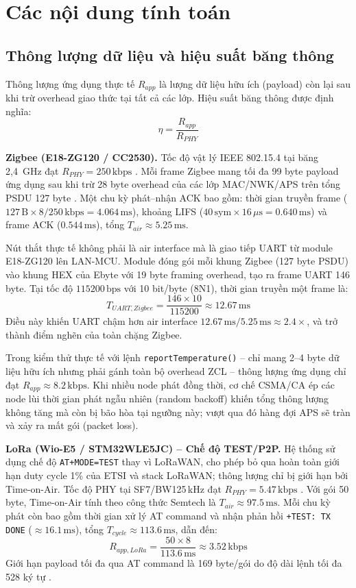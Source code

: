 \chapter{Các nội dung tính toán}
    \section{Thông lượng dữ liệu và hiệu suất băng thông}
 
        Thông lượng ứng dụng thực tế $R_{app}$ là lượng dữ liệu hữu ích (payload) còn lại sau khi trừ overhead giao thức tại tất cả các lớp. Hiệu suất băng thông được định nghĩa:
        \[ \eta = \frac{R_{app}}{R_{PHY}} \]
        
        \textbf{Zigbee (E18-ZG120 / CC2530).} Tốc độ vật lý IEEE 802.15.4 tại băng 2,4~GHz đạt $R_{PHY} = 250\,\text{kbps}$ \cite{ieee802154_2020}. Mỗi frame Zigbee mang tối đa 99 byte payload ứng dụng sau khi trừ 28 byte overhead của các lớp MAC/NWK/APS trên tổng PSDU 127 byte \cite{zigbee_spec_r21}. Một chu kỳ phát--nhận ACK bao gồm: thời gian truyền frame ($127\,\text{B} \times 8 / 250\,\text{kbps} = 4{.}064\,\text{ms}$), khoảng LIFS ($40\,\text{sym} \times 16\,\mu\text{s} = 0{.}640\,\text{ms}$) và frame ACK ($0{.}544\,\text{ms}$), tổng $T_{air} \approx 5{.}25\,\text{ms}$.
        
        Nút thắt thực tế không phải là air interface mà là giao tiếp UART từ module E18-ZG120 lên LAN-MCU. Module đóng gói mỗi khung Zigbee (127 byte PSDU) vào khung HEX của Ebyte với 19 byte framing overhead, tạo ra frame UART 146 byte. Tại tốc độ $115200\,\text{bps}$ với 10 bit/byte (8N1), thời gian truyền một frame là:
        \[ T_{UART,Zigbee} = \frac{146 \times 10}{115200} \approx 12{.}67\,\text{ms} \]
        Điều này khiến UART chậm hơn air interface $12{.}67\,\text{ms} / 5{.}25\,\text{ms} \approx 2{.}4\times$, và trở thành điểm nghẽn của toàn chặng Zigbee.
        
        Trong kiểm thử thực tế với lệnh \texttt{reportTemperature()} -- chỉ mang 2--4 byte dữ liệu hữu ích nhưng phải gánh toàn bộ overhead ZCL -- thông lượng ứng dụng chỉ đạt $R_{app} \approx 8{.}2\,\text{kbps}$. Khi nhiều node phát đồng thời, cơ chế CSMA/CA ép các node lùi thời gian phát ngẫu nhiên (random backoff) khiến tổng thông lượng không tăng mà còn bị bão hòa tại ngưỡng này; vượt qua đó hàng đợi APS sẽ tràn và xảy ra mất gói (packet loss).
        
        \textbf{LoRa (Wio-E5 / STM32WLE5JC) -- Chế độ TEST/P2P.} Hệ thống sử dụng chế độ \texttt{AT+MODE=TEST} thay vì LoRaWAN, cho phép bỏ qua hoàn toàn giới hạn duty cycle 1\% của ETSI và stack LoRaWAN; thông lượng chỉ bị giới hạn bởi Time-on-Air. Tốc độ PHY tại SF7/BW125\,kHz đạt $R_{PHY} = 5{.}47\,\text{kbps}$ \cite{semtech_lora_design_guide}. Với gói 50 byte, Time-on-Air tính theo công thức Semtech là $T_{air} \approx 97{.}5\,\text{ms}$. Mỗi chu kỳ phát còn bao gồm thời gian xử lý AT command và nhận phản hồi \texttt{+TEST: TX DONE} ($\approx 16{.}1\,\text{ms}$), tổng $T_{cycle} \approx 113{.}6\,\text{ms}$, dẫn đến:
        \[ R_{app,LoRa} = \frac{50 \times 8}{113{.}6\,\text{ms}} \approx 3{.}52\,\text{kbps} \]
        Giới hạn payload tối đa qua AT command là 169 byte/gói do độ dài lệnh tối đa 528 ký tự \cite{seeed_wioe5_at_cmd}.
        
